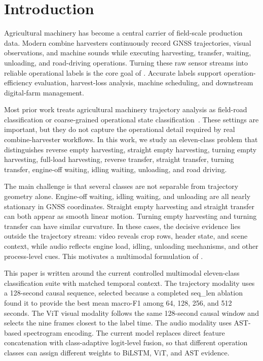 \section{Introduction}
\label{sec:intro}

Agricultural machinery has become a central carrier of field-scale production data. Modern combine harvesters continuously record GNSS trajectories, visual observations, and machine sounds while executing harvesting, transfer, waiting, unloading, and road-driving operations. Turning these raw sensor streams into reliable operational labels is the core goal of \task{}. Accurate labels support operation-efficiency evaluation, harvest-loss analysis, machine scheduling, and downstream digital-farm management.

Most prior work treats agricultural machinery trajectory analysis as field-road classification or coarse-grained operational state classification~\cite{pan2024chaos,zhai2024atrnet,zhai2024bilstm}. These settings are important, but they do not capture the operational detail required by real combine-harvester workflows. In this work, we study an eleven-class problem that distinguishes reverse empty harvesting, straight empty harvesting, turning empty harvesting, full-load harvesting, reverse transfer, straight transfer, turning transfer, engine-off waiting, idling waiting, unloading, and road driving.

The main challenge is that several classes are not separable from trajectory geometry alone. Engine-off waiting, idling waiting, and unloading are all nearly stationary in GNSS coordinates. Straight empty harvesting and straight transfer can both appear as smooth linear motion. Turning empty harvesting and turning transfer can have similar curvature. In these cases, the decisive evidence lies outside the trajectory stream: video reveals crop rows, header state, and scene context, while audio reflects engine load, idling, unloading mechanisms, and other process-level cues. This motivates a multimodal formulation of \task{}.

This paper is written around the current controlled multimodal eleven-class classification suite with matched temporal context. The trajectory modality uses a 128-second causal sequence, selected because a completed seq\_len ablation found it to provide the best mean macro-F1 among 64, 128, 256, and 512 seconds. The ViT visual modality follows the same 128-second causal window and selects the nine frames closest to the label time. The audio modality uses AST-based spectrogram encoding. The current \ours{} model replaces direct feature concatenation with class-adaptive logit-level fusion, so that different operation classes can assign different weights to BiLSTM, ViT, and AST evidence.


